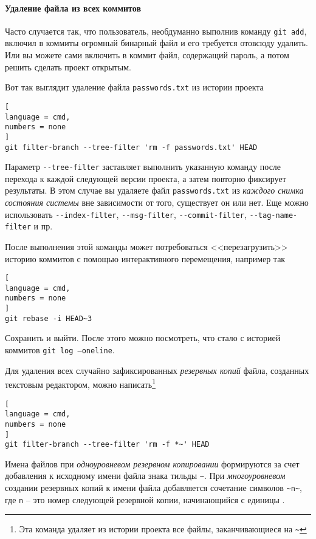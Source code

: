 \documentclass[%
	11pt,
	a4paper,
	utf8,
		]{article}
\begin{document}
\paragraph{Удаление файла из всех коммитов} Часто случается так, что пользователь, необдуманно выполнив команду \texttt{git add}, включил в коммиты огромный бинарный файл и его требуется отовсюду удалить. Или вы можете сами включить в коммит файл, содержащий пароль, а потом решить сделать проект открытым.

Вот так выглядит удаление файла \texttt{passwords.txt} из истории проекта

\begin{lstlisting}[
language = cmd,
numbers = none
]
git filter-branch --tree-filter 'rm -f passwords.txt' HEAD
\end{lstlisting}

Параметр \lstinline{--tree-filter} заставляет выполнить указанную команду после перехода к каждой следующей версии проекта, а затем повторно фиксирует результаты. В этом случае вы удаляете файл \texttt{passwords.txt} из \emph{каждого снимка состояния системы} вне зависимости от того, существует он или нет. Еще можно использовать \lstinline{--index-filter}, \lstinline{--msg-filter}, \lstinline{--commit-filter}, \lstinline{--tag-name-filter} и пр.

После выполнения этой команды может потребоваться <<перезагрузить>> историю коммитов с помощью интерактивного перемещения, например так
\begin{lstlisting}[
language = cmd,
numbers = none
]
git rebase -i HEAD~3
\end{lstlisting}

Сохранить и выйти. После этого можно посмотреть, что стало с историей коммитов \texttt{git log --oneline}.

Для удаления всех случайно зафиксированных \emph{резервных копий} файла, созданных текстовым редактором, можно написать\footnote{Эта команда удаляет из истории проекта все файлы, заканчивающиеся на \texttt{\~}}

\begin{lstlisting}[
language = cmd,
numbers = none
]
git filter-branch --tree-filter 'rm -f *~' HEAD
\end{lstlisting}

Имена файлов при \emph{одноуровневом резервном копировании} формируются за счет добавления к исходному имени файла знака тильды \lstinline{~}. При \emph{многоуровневом} создании резервных копий к имени файла добавляется сочетание символов \lstinline{~n~}, где \texttt{n} -- это номер следующей резервной копии, начинающийся с единицы \cite[стр.~230]{sobel:2011}.
\end{document}
